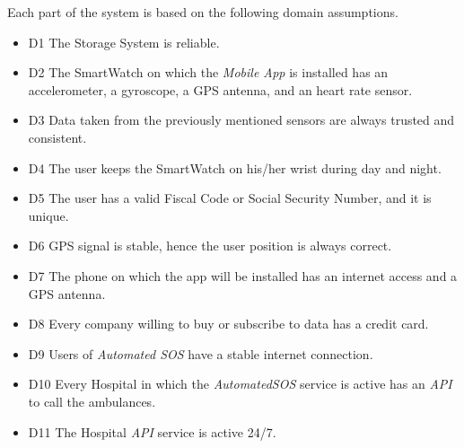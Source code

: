 Each part of the system is based on the following domain assumptions.
\begin{itemize}

    \item  D1  The Storage System is reliable.
    
    \item  D2  The SmartWatch on which the \textit{Mobile App} is installed has an accelerometer, a gyroscope, a GPS antenna, and an heart rate sensor.
    
    \item  D3  Data taken from the previously mentioned sensors are always trusted and consistent.
            
    \item  D4  The user keeps the SmartWatch on his/her wrist during day and night.
    
    \item  D5  The user has a valid Fiscal Code or Social Security Number, and it is unique.
             
    \item  D6  GPS signal is stable, hence the user position is always correct.

    \item  D7  The phone on which the app will be installed has an internet access and a GPS antenna.

    \item  D8  Every company willing to buy or subscribe to data has a credit card.

    \item  D9  Users of \textit{Automated SOS} have a stable internet connection.
    
    \item  D10  Every Hospital in which the \textit{AutomatedSOS} service is active has an \textit{API} to call the ambulances.
    
    \item  D11  The Hospital \textit{API} service is active 24/7.
    
\end{itemize}